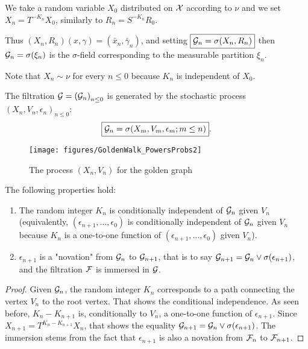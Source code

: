 \documentclass[12pt,a4paper]{article}
\begin{document}
We take a random variable $X_0$ distributed on $\mathcal{X}$ according to $\nu$ 
and we set $\boxed{X_n = T^{-K_n} X_0}$, similarly to $R_n = S^{-K_n} R_0$. 

Thus $(X_n,R_n)(x,\gamma) = (\bar x_n, \bar\gamma_n)$, 
and setting $\boxed{\mathcal{G}_n = \sigma(X_n, R_n)}$ then 
$\mathcal{G}_n = \sigma(\xi_n)$ is the $\sigma$-field corresponding to 
the measurable partition $\xi_n$. 

Note that $X_n \sim \nu$ for every $n \leq 0$ because $K_n$ is independent of $X_0$.

The filtration $\mathcal{G}={(\mathcal{G}_n)}_{n \leq 0}$ is  generated by the stochastic process 
${(X_n, V_n, \epsilon_n)}_{n \leq 0}$:
$$
\boxed{\mathcal{G}_n = \sigma(X_m, V_m, \epsilon_m; m \leq n)}. 
$$

\begin{figure}[!h]
\centering
	\texttt{[image: figures/GoldenWalk\_PowersProbs2]}
\caption{The process $(X_n, V_n)$ for the golden graph}
\end{figure}


\begin{lemma}\label{lemma:novation}
The following properties hold:
\begin{enumerate}
\item The random integer $K_n$ is conditionally independent of $\mathcal{G}_n$ 
given $V_n$ (equivalently, $(\epsilon_{n+1}, \ldots, \epsilon_0)$ 
is conditionally independent of $\mathcal{G}_n$ 
given $V_n$ because $K_n$ is a one-to-one function of 
$(\epsilon_{n+1}, \ldots, \epsilon_0)$ given $V_n$).

\item $\epsilon_{n+1}$ is 
a "novation" from $\mathcal{G}_n$ to $\mathcal{G}_{n+1}$, that is 
to say $\mathcal{G}_{n+1} = \mathcal{G}_n \vee \sigma(\epsilon_{n+1})$, and  
the filtration $\mathcal{F}$ is immersed in $\mathcal{G}$.
\end{enumerate}
\end{lemma}

\begin{proof}
Given $\mathcal{G}_n$, the random integer $K_n$ corresponds to a path  
connecting the vertex $V_n$ to the root vertex. 
That shows the conditional independence. 
As seen before, $K_{n}-K_{n+1}$ is, conditionally to $V_n$, 
a one-to-one function of $\epsilon_{n+1}$. Since 
$X_{n+1} = T^{K_{n}-K_{n+1}}X_n$, that shows the equality 
$\mathcal{G}_{n+1} = \mathcal{G}_n \vee \sigma(\epsilon_{n+1})$. 
The immersion stems from the fact that 
 $\epsilon_{n+1}$ is also a novation from $\mathcal{F}_n$ to $\mathcal{F}_{n+1}$.  
\end{proof}
\end{document}
